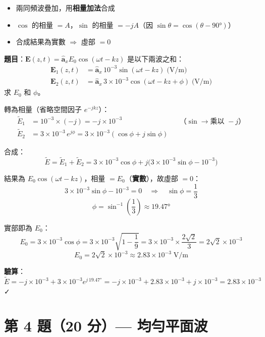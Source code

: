 \documentclass[12pt,a4paper]{article}
\newcommand{\vE}{\mathbf{E}}
\newcommand{\ax}{\hat{\mathbf{a}}_x}
\begin{document}
\begin{conceptbox}[核心概念]
\begin{itemize}
  \item 兩同頻波疊加，用\textbf{相量加法}合成
  \item $\cos$ 的相量 $= A$，$\sin$ 的相量 $= -jA$（因 $\sin\theta = \cos(\theta - 90°)$）
  \item 合成結果為實數 $\Rightarrow$ 虛部 $= 0$
\end{itemize}
\end{conceptbox}

\textbf{題目}：$\vE(z,t) = \ax E_0\cos(\omega t - kz)$ 是以下兩波之和：
\begin{align*}
  \vE_1(z,t) &= \ax\,10^{-3}\sin(\omega t - kz) \;\text{(V/m)} \\
  \vE_2(z,t) &= \ax\,3\times10^{-3}\cos(\omega t - kz + \phi) \;\text{(V/m)}
\end{align*}
求 $E_0$ 和 $\phi$。

\begin{solutionbox}[詳解]

轉為相量（省略空間因子 $e^{-jkz}$）：
\begin{align*}
  \tilde{E}_1 &= 10^{-3}\times(-j) = -j\times10^{-3}
  & &\text{（}\sin\to\text{乘以 }-j\text{）} \\
  \tilde{E}_2 &= 3\times10^{-3}\,e^{j\phi}
  = 3\times10^{-3}(\cos\phi + j\sin\phi)
\end{align*}

合成：
\[
  \tilde{E} = \tilde{E}_1 + \tilde{E}_2
  = 3\times10^{-3}\cos\phi + j\bigl(3\times10^{-3}\sin\phi - 10^{-3}\bigr)
\]

結果為 $E_0\cos(\omega t - kz)$，相量 $= E_0$（\textbf{實數}），故虛部 $= 0$：
\[
  3\times10^{-3}\sin\phi - 10^{-3} = 0
  \quad\Rightarrow\quad \sin\phi = \frac{1}{3}
\]
\[
  \boxed{\phi = \sin^{-1}\!\left(\frac{1}{3}\right) \approx 19.47°}
\]

實部即為 $E_0$：
\[
  E_0 = 3\times10^{-3}\cos\phi = 3\times10^{-3}\sqrt{1 - \frac{1}{9}}
  = 3\times10^{-3}\times\frac{2\sqrt{2}}{3} = 2\sqrt{2}\times10^{-3}
\]
\[
  \boxed{E_0 = 2\sqrt{2}\times10^{-3} \approx 2.83\times10^{-3} \;\text{V/m}}
\]

\textbf{驗算}：$\tilde{E} = -j\times10^{-3} + 3\times10^{-3}e^{j\,19.47°}
= -j\times10^{-3} + 2.83\times10^{-3} + j\times10^{-3} = 2.83\times10^{-3}$ ✓
\end{solutionbox}

\section{第 4 題（20 分）— 均勻平面波}
\end{document}
